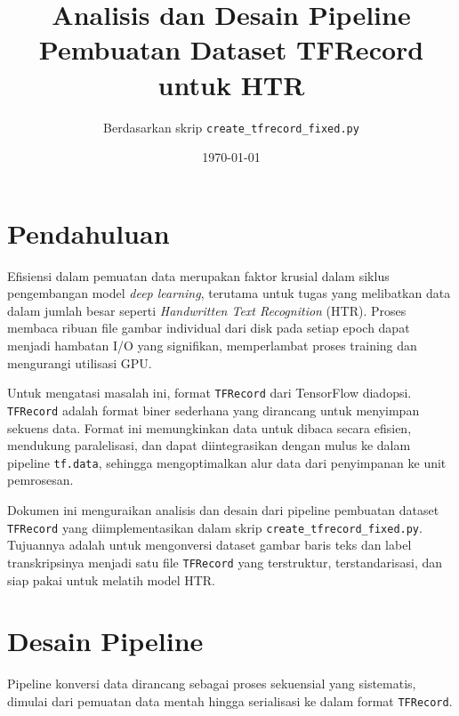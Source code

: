 \documentclass{article}
\title{Analisis dan Desain Pipeline Pembuatan Dataset TFRecord untuk HTR}
\author{Berdasarkan skrip \texttt{create\_tfrecord\_fixed.py}}
\date{\today}
\begin{document}
\maketitle

\section{Pendahuluan}

Efisiensi dalam pemuatan data merupakan faktor krusial dalam siklus pengembangan model \textit{deep learning}, terutama untuk tugas yang melibatkan data dalam jumlah besar seperti \textit{Handwritten Text Recognition} (HTR). Proses membaca ribuan file gambar individual dari disk pada setiap epoch dapat menjadi hambatan I/O yang signifikan, memperlambat proses training dan mengurangi utilisasi GPU.

Untuk mengatasi masalah ini, format \texttt{TFRecord} dari TensorFlow diadopsi. \texttt{TFRecord} adalah format biner sederhana yang dirancang untuk menyimpan sekuens data. Format ini memungkinkan data untuk dibaca secara efisien, mendukung paralelisasi, dan dapat diintegrasikan dengan mulus ke dalam pipeline \texttt{tf.data}, sehingga mengoptimalkan alur data dari penyimpanan ke unit pemrosesan.

Dokumen ini menguraikan analisis dan desain dari pipeline pembuatan dataset \texttt{TFRecord} yang diimplementasikan dalam skrip \texttt{create\_tfrecord\_fixed.py}. Tujuannya adalah untuk mengonversi dataset gambar baris teks dan label transkripsinya menjadi satu file \texttt{TFRecord} yang terstruktur, terstandarisasi, dan siap pakai untuk melatih model HTR.

\section{Desain Pipeline}

Pipeline konversi data dirancang sebagai proses sekuensial yang sistematis, dimulai dari pemuatan data mentah hingga serialisasi ke dalam format \texttt{TFRecord}.
\end{document}
